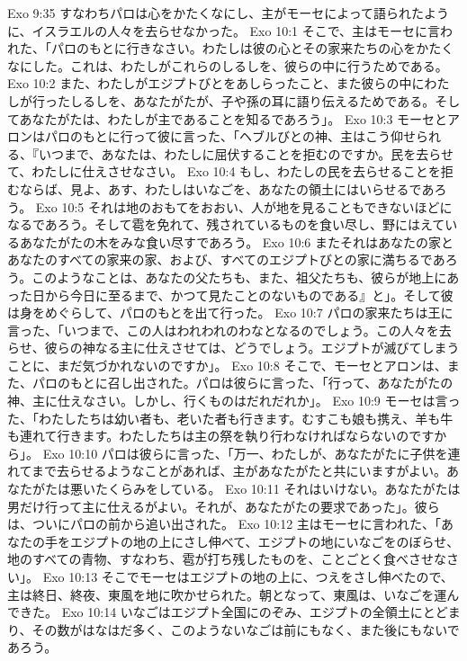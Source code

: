 Exo 9:35  すなわちパロは心をかたくなにし、主がモーセによって語られたように、イスラエルの人々を去らせなかった。
Exo 10:1  そこで、主はモーセに言われた、「パロのもとに行きなさい。わたしは彼の心とその家来たちの心をかたくなにした。これは、わたしがこれらのしるしを、彼らの中に行うためである。
Exo 10:2  また、わたしがエジプトびとをあしらったこと、また彼らの中にわたしが行ったしるしを、あなたがたが、子や孫の耳に語り伝えるためである。そしてあなたがたは、わたしが主であることを知るであろう」。
Exo 10:3  モーセとアロンはパロのもとに行って彼に言った、「ヘブルびとの神、主はこう仰せられる、『いつまで、あなたは、わたしに屈伏することを拒むのですか。民を去らせて、わたしに仕えさせなさい。
Exo 10:4  もし、わたしの民を去らせることを拒むならば、見よ、あす、わたしはいなごを、あなたの領土にはいらせるであろう。
Exo 10:5  それは地のおもてをおおい、人が地を見ることもできないほどになるであろう。そして雹を免れて、残されているものを食い尽し、野にはえているあなたがたの木をみな食い尽すであろう。
Exo 10:6  またそれはあなたの家とあなたのすべての家来の家、および、すべてのエジプトびとの家に満ちるであろう。このようなことは、あなたの父たちも、また、祖父たちも、彼らが地上にあった日から今日に至るまで、かつて見たことのないものである』と」。そして彼は身をめぐらして、パロのもとを出て行った。
Exo 10:7  パロの家来たちは王に言った、「いつまで、この人はわれわれのわなとなるのでしょう。この人々を去らせ、彼らの神なる主に仕えさせては、どうでしょう。エジプトが滅びてしまうことに、まだ気づかれないのですか」。
Exo 10:8  そこで、モーセとアロンは、また、パロのもとに召し出された。パロは彼らに言った、「行って、あなたがたの神、主に仕えなさい。しかし、行くものはだれだれか」。
Exo 10:9  モーセは言った、「わたしたちは幼い者も、老いた者も行きます。むすこも娘も携え、羊も牛も連れて行きます。わたしたちは主の祭を執り行わなければならないのですから」。
Exo 10:10  パロは彼らに言った、「万一、わたしが、あなたがたに子供を連れてまで去らせるようなことがあれば、主があなたがたと共にいますがよい。あなたがたは悪いたくらみをしている。
Exo 10:11  それはいけない。あなたがたは男だけ行って主に仕えるがよい。それが、あなたがたの要求であった」。彼らは、ついにパロの前から追い出された。
Exo 10:12  主はモーセに言われた、「あなたの手をエジプトの地の上にさし伸べて、エジプトの地にいなごをのぼらせ、地のすべての青物、すなわち、雹が打ち残したものを、ことごとく食べさせなさい」。
Exo 10:13  そこでモーセはエジプトの地の上に、つえをさし伸べたので、主は終日、終夜、東風を地に吹かせられた。朝となって、東風は、いなごを運んできた。
Exo 10:14  いなごはエジプト全国にのぞみ、エジプトの全領土にとどまり、その数がはなはだ多く、このようないなごは前にもなく、また後にもないであろう。
